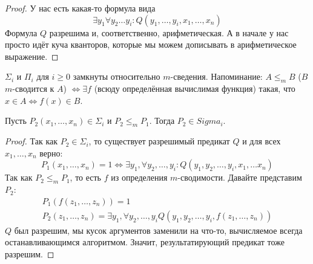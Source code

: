 	\begin{proof}
		У нас есть какая-то формула вида
		\[\exists y_1 \forall y_2 \dots y_i \colon Q(y_1, \dots, y_i, x_1, \dots, x_n)\]
		Формула $Q$ разрешима и, соответственно, арифметическая.
		А в начале у нас просто идёт куча кванторов, которые мы можем дописывать в арифметическое выражение.
	\end{proof}

\item
	$\Sigma_i$ и $\Pi_i$ для $i \ge 0$ замкнуты относительно $m$-сведения.
	Напоминание: $A \le_m B $ ($B$ $m$-сводится к $A$) $\iff \exists f$ (всюду определённая вычислимая функция) такая,
	что $x \in A \iff f(x) \in B$.

	Пусть $P_2(x_1, \dots, x_n) \in \Sigma_i$ и $P_2 \le_m P_1$.
	Тогда $P_2 \in Sigma_i$.
	\begin{proof}
		Так как $P_2 \in \Sigma_i$, то существует разрешимый предикат $Q$ и для всех $x_1, \dots, x_n$ верно:
		\[ P_1(x_1, \dots, x_n)=1 \iff \exists y_1, \forall y_2, \dots, y_i \colon Q(y_1, y_2, \dots, y_i, x_1, \dots x_n) \]
		Так как $P_2 \le_m P_1$, то есть $f$ из определения $m$-сводимости.
		Давайте представим $P_2$:
		\begin{gather*}
		P_1(f(z_1, \dots, z_n)) = 1 \\
		P_2(z_1, \dots, z_n) = \exists y_1, \forall y_2, \dots, y_i Q(y_1, y_2, \dots, y_i, f(z_1, \dots, z_n))
		\end{gather*}
		$Q$ был разрешим, мы кусок аргументов заменили на что-то, вычисляемое всегда останавливающимся
		алгоритмом.
		Значит, результатирующий предикат тоже разрешим.
	\end{proof}

